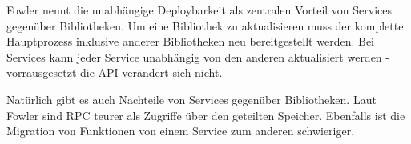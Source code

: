 Fowler nennt die unabhängige Deploybarkeit als zentralen Vorteil von Services
gegenüber Bibliotheken. Um eine Bibliothek zu aktualisieren muss der komplette
Hauptprozess inklusive anderer Bibliotheken neu bereitgestellt werden. Bei
Services kann jeder Service unabhängig von den anderen aktualisiert werden -
vorrausgesetzt die \ac{API} verändert sich nicht.

Natürlich gibt es auch Nachteile von Services gegenüber Bibliotheken. Laut
Fowler sind RPC teurer als Zugriffe über den geteilten Speicher. Ebenfalls ist
die Migration von Funktionen von einem Service zum anderen schwieriger.
